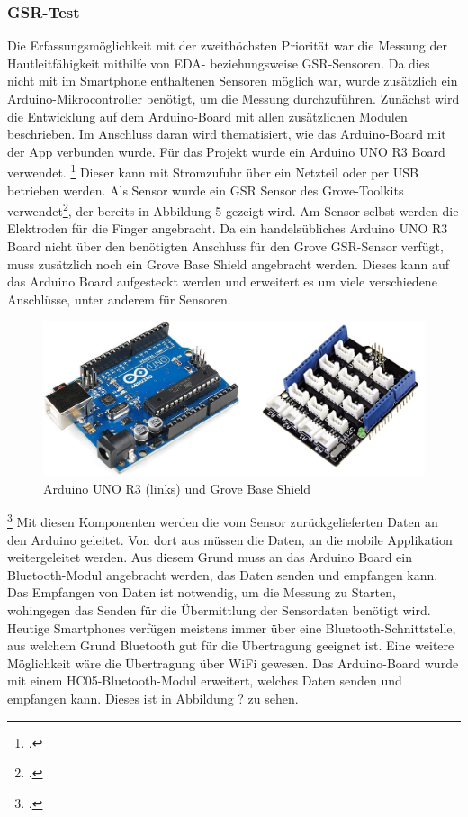 \subsubsection{GSR-Test}
Die Erfassungsmöglichkeit mit der zweithöchsten Priorität war die Messung der Hautleitfähigkeit mithilfe von EDA- beziehungsweise GSR-Sensoren. Da dies nicht mit im Smartphone enthaltenen Sensoren möglich war, wurde zusätzlich ein Arduino-Mikrocontroller benötigt, um die Messung durchzuführen. Zunächst wird die Entwicklung auf dem Arduino-Board mit allen zusätzlichen Modulen beschrieben. Im Anschluss daran wird thematisiert, wie das Arduino-Board mit der App verbunden wurde. \newline
Für das Projekt wurde ein Arduino UNO R3 Board verwendet. \footcite[Vgl.][]{Ard18} Dieser kann mit Stromzufuhr über ein Netzteil oder per USB betrieben werden. Als Sensor wurde ein GSR Sensor des Grove-Toolkits verwendet\footcite[Vgl.][]{Gro18}, der bereits in Abbildung 5 gezeigt wird. Am Sensor selbst werden die Elektroden für die Finger angebracht. Da ein handelsübliches Arduino UNO R3 Board nicht über den benötigten Anschluss für den Grove GSR-Sensor verfügt, muss zusätzlich noch ein Grove Base Shield angebracht werden. Dieses kann auf das Arduino Board aufgesteckt werden und erweitert es um viele verschiedene Anschlüsse, unter anderem für Sensoren.
\begin{figure}[h]
	\centering
	\includegraphics[width=16cm]{Bilder/arduino.jpg}
	\caption[Arduino UNO R3 (links) und Grove Base Shield]{Arduino UNO R3 (links) und Grove Base Shield\footnotemark}
\end{figure}%
\footcitetext[Bilder von:][]{Sou18, Rei18}
\newline \newline
Mit diesen Komponenten werden die vom Sensor zurückgelieferten Daten an den Arduino geleitet. Von dort aus müssen die Daten, an die mobile Applikation weitergeleitet werden. Aus diesem Grund muss an das Arduino Board ein Bluetooth-Modul angebracht werden, das Daten senden und empfangen kann. Das Empfangen von Daten ist notwendig, um die Messung zu Starten, wohingegen das Senden für die Übermittlung der Sensordaten benötigt wird. Heutige Smartphones verfügen meistens immer über eine Bluetooth-Schnittstelle, aus welchem Grund Bluetooth gut für die Übertragung geeignet ist. Eine weitere Möglichkeit wäre die Übertragung über WiFi gewesen. Das Arduino-Board wurde mit einem HC05-Bluetooth-Modul erweitert, welches Daten senden und empfangen kann. Dieses ist in Abbildung ? zu sehen.
